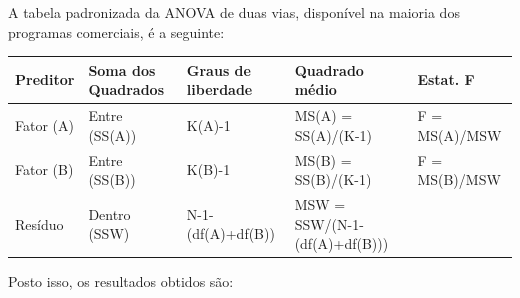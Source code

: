 \documentclass[
]{book}
\newenvironment{Shaded}{\begin{snugshade}}{\end{snugshade}}
\newcommand{\KeywordTok}[1]{\textcolor[rgb]{0.13,0.29,0.53}{\textbf{#1}}}
\newcommand{\NormalTok}[1]{#1}
\newcommand{\OperatorTok}[1]{\textcolor[rgb]{0.81,0.36,0.00}{\textbf{#1}}}
\newcommand{\StringTok}[1]{\textcolor[rgb]{0.31,0.60,0.02}{#1}}
\begin{document}
A tabela padronizada da ANOVA de duas vias, disponível na maioria dos programas comerciais, é a seguinte:

\begin{longtable}[]{@{}lllll@{}}
\toprule
Preditor & Soma dos Quadrados & Graus de liberdade & Quadrado médio & Estat. F\tabularnewline
\midrule
\endhead
Fator (A) & Entre (SS(A)) & K(A)-1 & MS(A) = SS(A)/(K-1) & F = MS(A)/MSW\tabularnewline
Fator (B) & Entre (SS(B)) & K(B)-1 & MS(B) = SS(B)/(K-1) & F = MS(B)/MSW\tabularnewline
Resíduo & Dentro (SSW) & N-1-(df(A)+df(B)) & MSW = SSW/(N-1-(df(A)+df(B))) &\tabularnewline
\bottomrule
\end{longtable}

Posto isso, os resultados obtidos são:

\begin{Shaded}
\end{Shaded}
\end{document}
